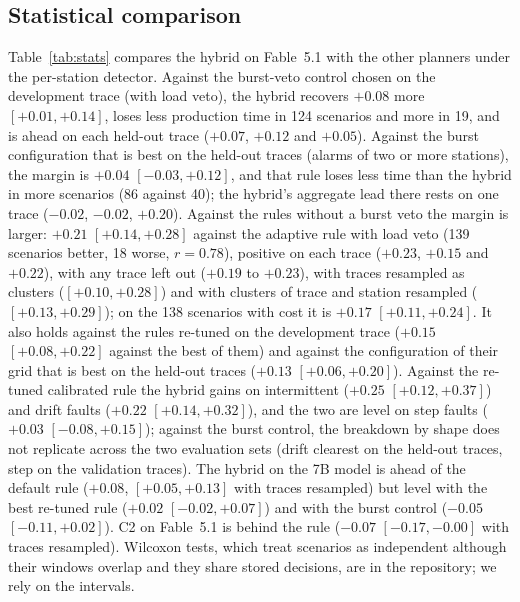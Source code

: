 \documentclass[preprint,11pt]{elsarticle}
\begin{document}
\subsection{Statistical comparison}
Table~\ref{tab:stats} compares the hybrid on Fable~5.1 with the other planners under the per-station detector. Against the burst-veto control chosen on the development trace (with load veto), the hybrid recovers $+0.08$ more $[+0.01, +0.14]$, loses less production time in 124 scenarios and more in 19, and is ahead on each held-out trace ($+0.07$, $+0.12$ and $+0.05$). Against the burst configuration that is best on the held-out traces (alarms of two or more stations), the margin is $+0.04$ $[-0.03, +0.12]$, and that rule loses less time than the hybrid in more scenarios (86 against 40); the hybrid's aggregate lead there rests on one trace ($-0.02$, $-0.02$, $+0.20$). Against the rules without a burst veto the margin is larger: $+0.21$ $[+0.14, +0.28]$ against the adaptive rule with load veto (139 scenarios better, 18 worse, $r=0.78$), positive on each trace ($+0.23$, $+0.15$ and $+0.22$), with any trace left out ($+0.19$ to $+0.23$), with traces resampled as clusters ($[+0.10, +0.28]$) and with clusters of trace and station resampled ($[+0.13, +0.29]$); on the 138 scenarios with cost it is $+0.17$ $[+0.11, +0.24]$. It also holds against the rules re-tuned on the development trace ($+0.15$ $[+0.08, +0.22]$ against the best of them) and against the configuration of their grid that is best on the held-out traces ($+0.13$ $[+0.06, +0.20]$). Against the re-tuned calibrated rule the hybrid gains on intermittent ($+0.25$ $[+0.12, +0.37]$) and drift faults ($+0.22$ $[+0.14, +0.32]$), and the two are level on step faults ($+0.03$ $[-0.08, +0.15]$); against the burst control, the breakdown by shape does not replicate across the two evaluation sets (drift clearest on the held-out traces, step on the validation traces). The hybrid on the 7B model is ahead of the default rule ($+0.08$, $[+0.05, +0.13]$ with traces resampled) but level with the best re-tuned rule ($+0.02$ $[-0.02, +0.07]$) and with the burst control ($-0.05$ $[-0.11, +0.02]$). C2 on Fable~5.1 is behind the rule ($-0.07$ $[-0.17, -0.00]$ with traces resampled). Wilcoxon tests, which treat scenarios as independent although their windows overlap and they share stored decisions, are in the repository; we rely on the intervals.
\end{document}
